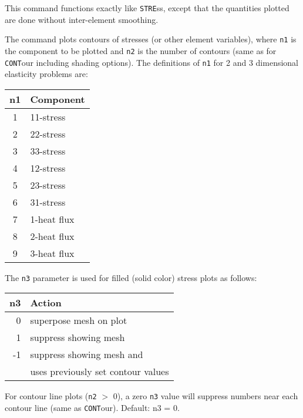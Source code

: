\headb

This command functions exactly like {\tt STRE}ss, except
that the quantities plotted are done without inter-element smoothing.

The command plots contours
of stresses (or other element variables), where {\tt n1} is the component to be
plotted and {\tt n2} is the number of contours (same as for {\tt CONT}our
including shading options).  The definitions of {\tt n1} for 2 and 3
dimensional elasticity problems are:

\begin{center}
\begin{tabular}{c | l}
  n1 & Component \\ \hline
   1 & 11-stress \\
   2 & 22-stress \\
   3 & 33-stress \\
   4 & 12-stress \\
   5 & 23-stress \\
   6 & 31-stress \\
   7 & 1-heat flux \\
   8 & 2-heat flux \\
   9 & 3-heat flux
\end{tabular}
\end{center}

The {\tt n3} parameter is used for filled (solid color) stress
plots as follows:

\begin{center}
\begin{tabular}{r | l}
    n3 & Action \\ \hline
     0 & superpose mesh on plot \\
     1 & suppress showing mesh \\
    -1 & suppress showing mesh and \\
       & uses previously set contour values
\end{tabular}
\end{center}

For contour line plots ({\tt n2} $>$ 0), a zero {\tt n3} value will
suppress numbers near each contour line (same as
{\tt CONT}our). Default: n3 = 0.
\vfill
\eject

